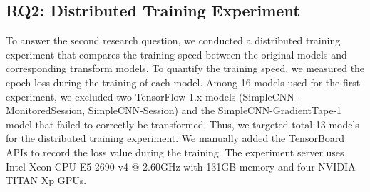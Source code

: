 \subsection{RQ2: Distributed Training Experiment}

To answer the second research question,
we conducted a distributed training experiment that compares
the training speed between the original models
and corresponding transform models.
To quantify the training speed, we measured the epoch loss during the training
of each model.
Among 16 models used for the first experiment,
we excluded two TensorFlow 1.x models (SimpleCNN-MonitoredSession,
SimpleCNN-Session) and the SimpleCNN-GradientTape-1 model that failed to
correctly be transformed.
Thus, we targeted total 13 models for the distributed training experiment.
We manually added the TensorBoard\cite{tensorboard} APIs to 
record the loss value during the training. 
The experiment server uses
Intel Xeon CPU E5-2690 v4 @ 2.60GHz with 131GB memory and four 
NVIDIA TITAN Xp GPUs.

